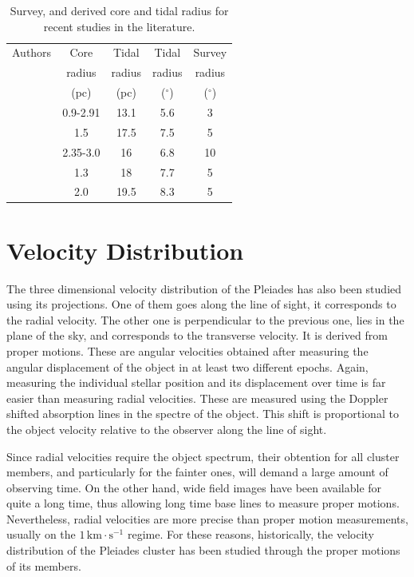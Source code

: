 \begin{table}[ht!]
\caption{Survey, and derived core and tidal radius for recent studies in the literature. }
\begin{center}
\begin{tabular}{ccccc}
Authors &Core&Tidal& Tidal & Survey\\
&radius&radius&radius&radius\\
&(pc)&(pc)&($^\circ$)&($^\circ$)\\
\hline
\citet{Pinfield1998}&0.9-2.91&13.1&5.6&3\\
\citet{Raboud1998}&1.5&17.5&7.5&5\\
\citet{Adams2001}&2.35-3.0&16&6.8&10\\
\citet{Converse2008}&1.3&18&7.7&5\\
\citet{Converse2010}&2.0&19.5&8.3&5\\
\hline
\end{tabular}
\end{center}
\label{tab:tidal_iterature}
\end{table}%

  
\section{Velocity Distribution}

The three dimensional velocity distribution of the Pleiades has also been studied using its projections. One of them goes along the line of sight, it corresponds to the radial velocity. The other one is perpendicular to the previous one, lies in the plane of the sky, and corresponds to the transverse velocity. It is derived from  proper motions. These are angular velocities obtained after measuring the angular displacement of the object in at least two different epochs. Again, measuring the individual stellar position and its displacement over time is far easier than measuring radial velocities. These are measured using the Doppler shifted absorption lines in the spectre of the object. This shift is proportional to the object velocity relative to the observer along the line of sight. 

Since radial velocities require the object spectrum, their obtention for all cluster members, and particularly for the fainter ones, will demand a large amount of observing time. On the other hand, wide field images have been available for quite a long time, thus allowing long time base lines to measure proper motions.  Nevertheless, radial velocities are more precise than proper motion measurements, usually on the $1 \,\mathrm{km\cdot s^{-1}}$ regime. For these reasons, historically, the velocity distribution of the Pleiades cluster has been studied through the proper motions of its members. 

